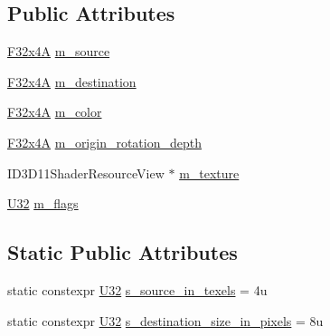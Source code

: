 \subsection*{Public Attributes}
\begin{DoxyCompactItemize}
\item 
\mbox{\hyperlink{namespacemage_a99a049e7dfdfdc8f4645e54fa0fccfa4}{F32x4A}} \mbox{\hyperlink{structmage_1_1rendering_1_1anonymous__namespace_02sprite__batch_8cpp_03_1_1_sprite_info_a0fa72c66632b71fda2df06fc34994c05}{m\+\_\+source}}
\item 
\mbox{\hyperlink{namespacemage_a99a049e7dfdfdc8f4645e54fa0fccfa4}{F32x4A}} \mbox{\hyperlink{structmage_1_1rendering_1_1anonymous__namespace_02sprite__batch_8cpp_03_1_1_sprite_info_a79a138828a5a066241472097754a3730}{m\+\_\+destination}}
\item 
\mbox{\hyperlink{namespacemage_a99a049e7dfdfdc8f4645e54fa0fccfa4}{F32x4A}} \mbox{\hyperlink{structmage_1_1rendering_1_1anonymous__namespace_02sprite__batch_8cpp_03_1_1_sprite_info_a9727207b7efade72e6b3d9c2635f574a}{m\+\_\+color}}
\item 
\mbox{\hyperlink{namespacemage_a99a049e7dfdfdc8f4645e54fa0fccfa4}{F32x4A}} \mbox{\hyperlink{structmage_1_1rendering_1_1anonymous__namespace_02sprite__batch_8cpp_03_1_1_sprite_info_a180c77e11aeada21375ab7c038838b29}{m\+\_\+origin\+\_\+rotation\+\_\+depth}}
\item 
I\+D3\+D11\+Shader\+Resource\+View $\ast$ \mbox{\hyperlink{structmage_1_1rendering_1_1anonymous__namespace_02sprite__batch_8cpp_03_1_1_sprite_info_a6489b50a44ce6e5a2422b832e23de660}{m\+\_\+texture}}
\item 
\mbox{\hyperlink{namespacemage_aa5d6eaabaac3cdd01873d6a3d27e90f3}{U32}} \mbox{\hyperlink{structmage_1_1rendering_1_1anonymous__namespace_02sprite__batch_8cpp_03_1_1_sprite_info_aa40209d64316e04cea5a42f13241165a}{m\+\_\+flags}}
\end{DoxyCompactItemize}
\subsection*{Static Public Attributes}
\begin{DoxyCompactItemize}
\item 
static constexpr \mbox{\hyperlink{namespacemage_aa5d6eaabaac3cdd01873d6a3d27e90f3}{U32}} \mbox{\hyperlink{structmage_1_1rendering_1_1anonymous__namespace_02sprite__batch_8cpp_03_1_1_sprite_info_a250d1878dd8e5765620a19be904d7c0b}{s\+\_\+source\+\_\+in\+\_\+texels}} = 4u
\item 
static constexpr \mbox{\hyperlink{namespacemage_aa5d6eaabaac3cdd01873d6a3d27e90f3}{U32}} \mbox{\hyperlink{structmage_1_1rendering_1_1anonymous__namespace_02sprite__batch_8cpp_03_1_1_sprite_info_af59c51b1b99c77b257a5df4b17b0ba80}{s\+\_\+destination\+\_\+size\+\_\+in\+\_\+pixels}} = 8u
\end{DoxyCompactItemize}


